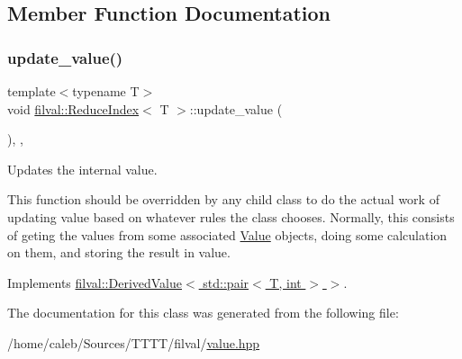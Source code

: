 \subsection{Member Function Documentation}
\hypertarget{classfilval_1_1ReduceIndex_a9c842f80d772c4c77cd3fe132a0f8730}{}\label{classfilval_1_1ReduceIndex_a9c842f80d772c4c77cd3fe132a0f8730} 
\subsubsection{\texorpdfstring{update\+\_\+value()}{update\_value()}}
{\footnotesize\ttfamily template$<$typename T$>$ \\
void \hyperlink{classfilval_1_1ReduceIndex}{filval\+::\+Reduce\+Index}$<$ T $>$\+::update\+\_\+value (\begin{DoxyParamCaption}{ }\end{DoxyParamCaption})\hspace{0.3cm}{\ttfamily [inline]}, {\ttfamily [private]}, {\ttfamily [virtual]}}



Updates the internal value. 

This function should be overridden by any child class to do the actual work of updating value based on whatever rules the class chooses. Normally, this consists of geting the values from some associated \hyperlink{classfilval_1_1Value}{Value} objects, doing some calculation on them, and storing the result in value. 

Implements \hyperlink{classfilval_1_1DerivedValue_a74e04450a550454510329a9e6b941304}{filval\+::\+Derived\+Value$<$ std\+::pair$<$ T, int $>$ $>$}.



The documentation for this class was generated from the following file\+:\begin{DoxyCompactItemize}
\item 
/home/caleb/\+Sources/\+T\+T\+T\+T/filval/\hyperlink{value_8hpp}{value.\+hpp}\end{DoxyCompactItemize}
